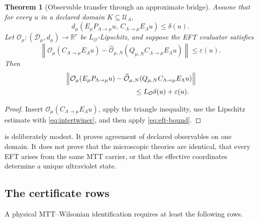 \documentclass[11pt]{article}
\newtheorem{theorem}{Theorem}[section]
\theoremstyle{definition}
\theoremstyle{remark}
\newcommand{\R}{\mathbb{R}}
\begin{document}
\begin{theorem}[Observable transfer through an approximate bridge]
\label{thm:bridge}
Assume that for every \(u\) in a declared domain \(K\subseteq\mathcal
U_\Lambda\),
\begin{equation}
 d_\mu\!\left(
 E_\mu P_{\Lambda\to\mu}u,\,
 C_{\Lambda\to\mu}E_\Lambda u
 \right)
 \leq\delta(u).
\label{eq:intertwiner}
\end{equation}
Let \(\mathcal O_\mu:(\mathcal D_\mu,d_\mu)\to\R^r\) be
\(L_{\mathcal O}\)-Lipschitz, and suppose the EFT evaluator satisfies
\begin{equation}
 \left\|
 \mathcal O_\mu(C_{\Lambda\to\mu}E_\Lambda u)
 -
 \widehat{\mathcal O}_{\mu,N}
 (Q_{\mu,N}C_{\Lambda\to\mu}E_\Lambda u)
 \right\|
 \leq\varepsilon(u).
\label{eq:eft-bound}
\end{equation}
Then
\begin{align}
 &\left\|
 \mathcal O_\mu(E_\mu P_{\Lambda\to\mu}u)
 -
 \widehat{\mathcal O}_{\mu,N}
 (Q_{\mu,N}C_{\Lambda\to\mu}E_\Lambda u)
 \right\|
 \nonumber\\
 &\hspace{35mm}
 \leq L_{\mathcal O}\delta(u)+\varepsilon(u).
\label{eq:bridge-bound}
\end{align}
\end{theorem}

\begin{proof}
Insert
\(\mathcal O_\mu(C_{\Lambda\to\mu}E_\Lambda u)\), apply the triangle
inequality, use the Lipschitz estimate with
\cref{eq:intertwiner}, and then apply \cref{eq:eft-bound}.
\end{proof}

 is deliberately modest.  It proves agreement of declared
observables on one domain.  It does not prove that the microscopic theories
are identical, that every EFT arises from the same MTT carrier, or that the
effective coordinates determine a unique ultraviolet state.

\subsection{The certificate rows}

A physical MTT--Wilsonian identification requires at least the following
rows.
\end{document}
